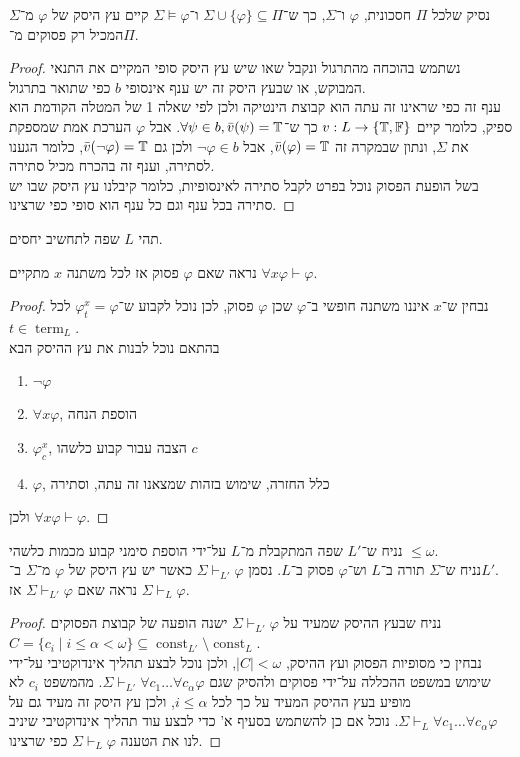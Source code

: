 \subquestion{}
נסיק שלכל $\Pi$ חסכונית, $\varphi$ ו־$\Sigma$, כך ש־$\Sigma \cup \{ \varphi \} \subseteq \Pi$ ו־$\Sigma \models \varphi$ קיים עץ היסק של $\varphi$ מ־$\Sigma$ המכיל רק פסוקים מ־$\Pi$.
\begin{proof}
	נשתמש בהוכחה מהתרגול ונקבל שאו שיש עץ היסק סופי המקיים את התנאי המבוקש, או שבעץ היסק זה יש ענף אינסופי $b$ כפי שתואר בתרגול. \\
	ענף זה כפי שראינו זה עתה הוא קבוצת הינטיקה ולכן לפי שאלה 1 של המטלה הקודמת הוא ספיק, כלומר קיים $v : L \to \{ \mathbb{T}, \mathbb{F} \}$ כך ש־$\forall \psi \in b, \bar{v}(\psi) = \mathbb{T}$.
	אבל $\varphi$ הערכת אמת שמספקת את $\Sigma$, ונתון שבמקרה זה $\bar{v}(\varphi) = \mathbb{T}$, אבל $\lnot \varphi \in b$ ולכן גם $\bar{v}(\lnot \varphi) = \mathbb{T}$, כלומר הגענו לסתירה, וענף זה בהכרח מכיל סתירה. \\
	בשל הופעת הפסוק נוכל בפרט לקבל סתירה לאינסופיות, כלומר קיבלנו עץ היסק שבו יש סתירה בכל ענף וגם כל ענף הוא סופי כפי שרצינו.
\end{proof}

\question{}
תהי $L$ שפה לתחשיב יחסים.

\subquestion{}
נראה שאם $\varphi$ פסוק אז לכל משתנה $x$ מתקיים $\forall x \varphi \vdash \varphi$.
\begin{proof}
	נבחין ש־$x$ איננו משתנה חופשי ב־$\varphi$ שכן $\varphi$ פסוק, לכן נוכל לקבוע ש־$\varphi_t^x = \varphi$ לכל $t \in \operatorname{term}_L$. \\
	בהתאם נוכל לבנות את עץ ההיסק הבא
	\begin{enumerate}
		\item $\lnot \varphi$
		\item $\forall x \varphi$, הוספת הנחה
		\item $\varphi_c^x$, הצבה עבור קבוע כלשהו $c$
		\item $\varphi$, כלל החזרה, שימוש בזהות שמצאנו זה עתה, וסתירה
	\end{enumerate}
	ולכן $\forall x \varphi \vdash \varphi$.
\end{proof}

\subquestion{}
נניח ש־$L'$ שפה המתקבלת מ־$L$ על־ידי הוספת סימני קבוע מכמות כלשהי $\le \omega$. \\
נניח ש־$\Sigma$ תורה ב־$L$ וש־$\varphi$ פסוק ב־$L$.
נסמן $\Sigma \vdash_{L'} \varphi$ כאשר יש עץ היסק של $\varphi$ מ־$\Sigma$ ב־$L'$. \\
נראה שאם $\Sigma \vdash_{L'} \varphi$ אז $\Sigma \vdash_L \varphi$.
\begin{proof}
	נניח שבעץ ההיסק שמעיד על $\Sigma \vdash_{L'} \varphi$ ישנה הופעה של קבוצת הפסוקים $C = \{ c_i \mid i \le \alpha < \omega \} \subseteq \operatorname{const}_{L'} \setminus \operatorname{const}_L$. \\
	נבחין כי מסופיות הפסוק ועץ ההיסק, $|C| < \omega$, ולכן נוכל לבצע תהליך אינדוקטיבי על־ידי שימוש במשפט ההכללה על־ידי פסוקים ולהסיק שגם $\Sigma \vdash_{L'} \forall c_1 \dots \forall c_\alpha \varphi$.
	מהמשפט $c_i$ לא מופיע בעץ ההיסק המעיד על כך לכל $i \le \alpha$, ולכן עץ היסק זה מעיד גם על $\Sigma \vdash_L \forall c_1 \dots \forall c_\alpha \varphi$.
	נוכל אם כן להשתמש בסעיף א' כדי לבצע עוד תהליך אינדוקטיבי שיניב לנו את הטענה $\Sigma \vdash_L \varphi$ כפי שרצינו.
\end{proof}

